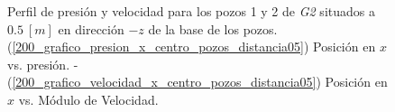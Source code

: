 \documentclass[10pt,a4paper,final]{article}
\begin{document}
\begin{figure}[tbhp]
   \centering
   \hspace{0.1\linewidth}
    \caption{Perfil de presión y velocidad para los pozos 1 y 2 de \emph{G2} situados a $0.5~[m]$ en dirección $-z$ de la base de los pozos. (\ref{200_grafico_presion_x_centro_pozos_distancia05}) Posición en $x$ vs. presión. - (\ref{200_grafico_velocidad_x_centro_pozos_distancia05}) Posición en $x$ vs. Módulo de Velocidad.}
   \label{200_grafico_velocidad_presion_centro_pozos_distancia05}                %
\end{figure}
\end{document}
